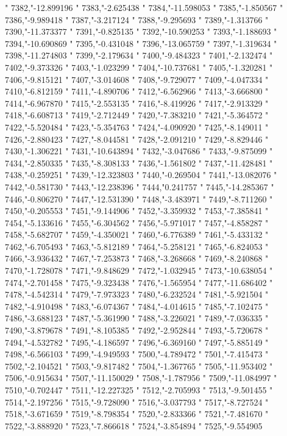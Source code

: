 "
7382,"-12.899196
"
7383,"-2.625438
"
7384,"-11.598053
"
7385,"-1.850567
"
7386,"-9.989418
"
7387,"-3.217124
"
7388,"-9.295693
"
7389,"-1.313766
"
7390,"-11.373377
"
7391,"-0.825135
"
7392,"-10.590253
"
7393,"-1.188693
"
7394,"-10.690869
"
7395,"-0.431048
"
7396,"-13.065759
"
7397,"-1.319634
"
7398,"-11.274803
"
7399,"-2.179634
"
7400,"-9.484323
"
7401,"-2.132474
"
7402,"-9.373326
"
7403,"-1.023299
"
7404,"-10.737681
"
7405,"-1.320281
"
7406,"-9.815121
"
7407,"-3.014608
"
7408,"-9.729077
"
7409,"-4.047334
"
7410,"-6.812159
"
7411,"-4.890706
"
7412,"-6.562966
"
7413,"-3.666800
"
7414,"-6.967870
"
7415,"-2.553135
"
7416,"-8.419926
"
7417,"-2.913329
"
7418,"-6.608713
"
7419,"-2.712449
"
7420,"-7.383210
"
7421,"-5.364572
"
7422,"-5.520484
"
7423,"-5.354763
"
7424,"-4.090920
"
7425,"-8.149011
"
7426,"-2.880423
"
7427,"-8.044581
"
7428,"-2.091210
"
7429,"-8.829446
"
7430,"-1.306221
"
7431,"-10.643894
"
7432,"-3.047686
"
7433,"-9.875099
"
7434,"-2.850335
"
7435,"-8.308133
"
7436,"-1.561802
"
7437,"-11.428481
"
7438,"-0.259251
"
7439,"-12.323803
"
7440,"-0.269504
"
7441,"-13.082076
"
7442,"-0.581730
"
7443,"-12.238396
"
7444,"0.241757
"
7445,"-14.285367
"
7446,"-0.806270
"
7447,"-12.531390
"
7448,"-3.483971
"
7449,"-8.711260
"
7450,"-0.205553
"
7451,"-9.144906
"
7452,"-3.359932
"
7453,"-7.385841
"
7454,"-5.133616
"
7455,"-6.304562
"
7456,"-5.971017
"
7457,"-4.858287
"
7458,"-5.682707
"
7459,"-4.350021
"
7460,"-6.776389
"
7461,"-5.433132
"
7462,"-6.705493
"
7463,"-5.812189
"
7464,"-5.258121
"
7465,"-6.824053
"
7466,"-3.936432
"
7467,"-7.253873
"
7468,"-3.268668
"
7469,"-8.240868
"
7470,"-1.728078
"
7471,"-9.848629
"
7472,"-1.032945
"
7473,"-10.638054
"
7474,"-2.701458
"
7475,"-9.323438
"
7476,"-1.565954
"
7477,"-11.686402
"
7478,"-4.542314
"
7479,"-7.973323
"
7480,"-6.232524
"
7481,"-5.921504
"
7482,"-4.910498
"
7483,"-6.074367
"
7484,"-4.014615
"
7485,"-7.102475
"
7486,"-3.688123
"
7487,"-5.361990
"
7488,"-3.226021
"
7489,"-7.036335
"
7490,"-3.879678
"
7491,"-8.105385
"
7492,"-2.952844
"
7493,"-5.720678
"
7494,"-4.532782
"
7495,"-4.186597
"
7496,"-6.369160
"
7497,"-5.885149
"
7498,"-6.566103
"
7499,"-4.949593
"
7500,"-4.789472
"
7501,"-7.415473
"
7502,"-2.104521
"
7503,"-9.817482
"
7504,"-1.367765
"
7505,"-11.953402
"
7506,"-0.915634
"
7507,"-11.150029
"
7508,"-1.787956
"
7509,"-11.084997
"
7510,"-0.702447
"
7511,"-12.227325
"
7512,"-2.705993
"
7513,"-9.501455
"
7514,"-2.197256
"
7515,"-9.728090
"
7516,"-3.037793
"
7517,"-8.727524
"
7518,"-3.671659
"
7519,"-8.798354
"
7520,"-2.833366
"
7521,"-7.481670
"
7522,"-3.888920
"
7523,"-7.866618
"
7524,"-3.854894
"
7525,"-9.554905
